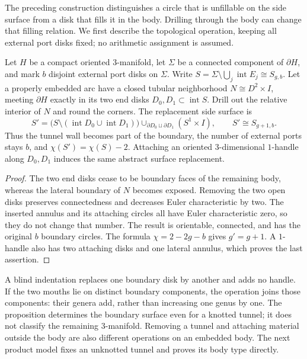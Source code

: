 The preceding construction distinguishes a circle that is unfillable on the
side surface from a disk that fills it in the body.  Drilling through the body
can change that filling relation.  We first describe the topological operation,
keeping all external port disks fixed; no arithmetic assignment is assumed.

\begin{proposition}
\label{prop:tunnel-boundary-surgery}
Let $H$ be a compact oriented $3$-manifold, let $\Sigma$ be a connected component
of $\partial H$, and mark $b$ disjoint external port disks on $\Sigma$.  Write
$S=\Sigma\setminus\bigcup_j\operatorname{int}E_j\cong S_{g,b}$.
Let a properly embedded arc have a closed tubular neighborhood
$N\cong D^2\times I$, meeting $\partial H$ exactly in its two end disks
$D_0,D_1\subset\operatorname{int}S$.  Drill out the relative interior of $N$
and round the corners.  The replacement side surface is
\[
 S'=\bigl(S\setminus(\operatorname{int}D_0\cup\operatorname{int}D_1)\bigr)
       \cup_{\partial D_0\sqcup\partial D_1}(S^1\times I),
 \qquad S'\cong S_{g+1,b}.
\]
Thus the tunnel wall becomes part of the boundary, the number of external
ports stays $b$, and $\chi(S')=\chi(S)-2$.  Attaching an oriented $3$-dimensional
$1$-handle along $D_0,D_1$ induces the same abstract surface replacement.
\end{proposition}

\begin{proof}
The two end disks cease to be boundary faces of the remaining body, whereas
the lateral boundary of $N$ becomes exposed.  Removing the two open disks
preserves connectedness and decreases Euler characteristic by two.  The
inserted annulus and its attaching circles all have Euler characteristic zero,
so they do not change that number.  The result is orientable, connected, and
has the original $b$ boundary circles.  The formula $\chi=2-2g-b$ gives
$g'=g+1$.  A $1$-handle also has two attaching disks and one lateral annulus,
which proves the last assertion.
\end{proof}

\begin{remark}
\label{rem:tunnel-scope}
A blind indentation replaces one boundary disk by another and adds no handle.
If the two mouths lie on distinct boundary components, the operation joins
those components: their genera add, rather than increasing one genus by one.
The proposition determines the boundary surface even for a knotted tunnel; it
does not classify the remaining $3$-manifold.  Removing a tunnel and attaching
material outside the body are also different operations on an embedded body.
The next product model fixes an unknotted tunnel and proves its body type
directly.
\end{remark}

